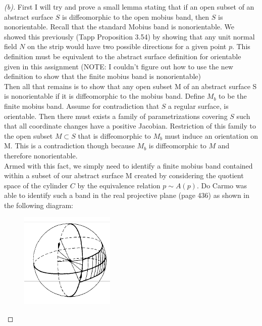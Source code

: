 \documentclass[a4paper, 11pt]{article}
\begin{document}
		\begin{proof}[(b)]
			First I will try and prove a small lemma stating that if an open subset of an abstract surface $S$ is diffeomorphic to the open mobius band, then $S$ is nonorientable. Recall that the standard Mobius band is nonorientable. We showed this previously (Tapp Proposition 3.54) by showing that any unit normal field $N$ on the strip would have two possible directions for a given point $p$. This definition must be equivalent to the abstract surface definition for orientable given in this assignment (NOTE: I couldn't figure out how to use the new definition to show that the finite mobius band is nonorientable)\\
			
			\noindent Then all that remains is to show that any open subset M of an abstract surface S is nonorientable if it is diffeomorphic to the mobius band. Define $M_b$ to be the finite mobius band. Assume for contradiction that $S$ a regular surface, is orientable. Then there must exists a family of parametrizations covering $S$ such that all coordinate changes have a positive Jacobian. Restriction of this family to the open subset $M\subset S$ that is diffeomorphic to $M_b$ must induce an orientation on M. This is a contradiction though because $M_b$ is diffeomorphic to $M$ and therefore nonorientable. \\ 
			
			\noindent Armed with this fact, we simply need to identify a finite mobius band contained within a subset of our abstract surface M created by considering the quotient space of the cylinder $C$ by the equivalence relation $p\sim A(p)$. Do Carmo was able to identify such a band in the real projective plane (page 436) as shown in the following diagram:  \\ 
			\pagebreak 
				\begin{figure}[!hbt]
					\centering
					\includegraphics[width=0.25\columnwidth]{mobiusStrip_realProjective}
				\end{figure}
		

\end{proof}
\end{document}
